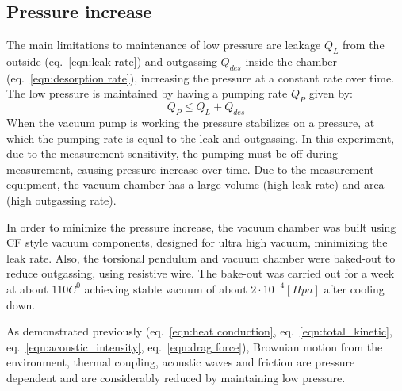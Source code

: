 \documentclass[\main/master.tex]{subfiles}
\begin{document}
\subsection{Pressure increase}
\par\noindent
The main limitations to maintenance of low pressure are leakage $Q_L$ from the outside (eq.~\ref{eqn:leak rate}) and outgassing $Q_{des}$ inside the chamber (eq.~\ref{eqn:desorption rate}), increasing the pressure at a constant rate over time. The low pressure is maintained by having a pumping rate $Q_P$ given by:
\begin{equation}
Q_P \leq Q_L + Q_{des}  \label{eqn:vacuum_equilibrium}
\end{equation}
When the vacuum pump is working the pressure stabilizes on a pressure, at which the pumping rate is equal to the leak and outgassing. In this experiment, due to the measurement sensitivity, the pumping must be off during measurement, causing pressure increase over time. Due to the measurement equipment, the vacuum chamber has a large volume (high leak rate) and area (high outgassing rate).
\par\noindent
In order to minimize the pressure increase, the vacuum chamber was built using CF style vacuum components, designed for ultra high vacuum, minimizing the leak rate. Also, the torsional pendulum and vacuum chamber were baked-out to reduce outgassing, using resistive wire. The bake-out was carried out for a week at about $110 C^0$ achieving stable vacuum of about $2\cdot 10^{−4} [Hpa]$ after cooling down.
\par\noindent
As demonstrated previously (eq.~\ref{eqn:heat conduction}, eq.~\ref{eqn:total_kinetic}, eq.~\ref{eqn:acoustic_intensity}, eq.~\ref{eqn:drag force}), Brownian motion from the environment, thermal coupling, acoustic waves and friction are pressure dependent and are considerably reduced by maintaining low pressure.
\end{document}

